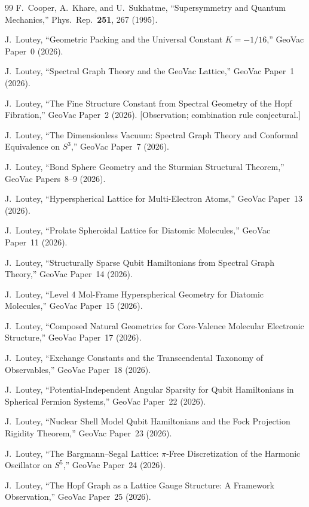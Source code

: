\documentclass[twocolumn,pra,amsmath,amssymb,superscriptaddress]{revtex4-2}
\begin{document}
\begin{thebibliography}{99}
F.~Cooper, A.~Khare, and U.~Sukhatme,
``Supersymmetry and Quantum Mechanics,''
Phys.\ Rep.\ \textbf{251}, 267 (1995).

J.~Loutey,
``Geometric Packing and the Universal Constant $K = -1/16$,''
GeoVac Paper~0 (2026).

J.~Loutey,
``Spectral Graph Theory and the GeoVac Lattice,''
GeoVac Paper~1 (2026).

J.~Loutey,
``The Fine Structure Constant from Spectral Geometry of the Hopf
Fibration,''
GeoVac Paper~2 (2026). [Observation; combination rule conjectural.]

J.~Loutey,
``The Dimensionless Vacuum: Spectral Graph Theory and Conformal
Equivalence on $S^3$,''
GeoVac Paper~7 (2026).

J.~Loutey,
``Bond Sphere Geometry and the Sturmian Structural Theorem,''
GeoVac Papers~8--9 (2026).

J.~Loutey,
``Hyperspherical Lattice for Multi-Electron Atoms,''
GeoVac Paper~13 (2026).

J.~Loutey,
``Prolate Spheroidal Lattice for Diatomic Molecules,''
GeoVac Paper~11 (2026).

J.~Loutey,
``Structurally Sparse Qubit Hamiltonians from Spectral Graph
Theory,''
GeoVac Paper~14 (2026).

J.~Loutey,
``Level 4 Mol-Frame Hyperspherical Geometry for Diatomic
Molecules,''
GeoVac Paper~15 (2026).

J.~Loutey,
``Composed Natural Geometries for Core-Valence Molecular
Electronic Structure,''
GeoVac Paper~17 (2026).

J.~Loutey,
``Exchange Constants and the Transcendental Taxonomy of
Observables,''
GeoVac Paper~18 (2026).

J.~Loutey,
``Potential-Independent Angular Sparsity for Qubit Hamiltonians in
Spherical Fermion Systems,''
GeoVac Paper~22 (2026).

J.~Loutey,
``Nuclear Shell Model Qubit Hamiltonians and the Fock Projection
Rigidity Theorem,''
GeoVac Paper~23 (2026).

J.~Loutey,
``The Bargmann--Segal Lattice: $\pi$-Free Discretization of the
Harmonic Oscillator on $S^5$,''
GeoVac Paper~24 (2026).

J.~Loutey,
``The Hopf Graph as a Lattice Gauge Structure: A Framework
Observation,''
GeoVac Paper~25 (2026).


\end{thebibliography}
\end{document}
